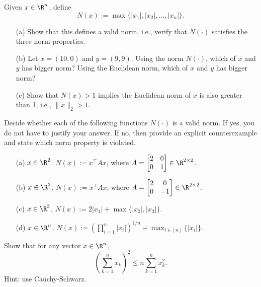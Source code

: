 \documentclass[11pt,nocut]{article}
\begin{document}


\bigskip

\begin{problem}[2.5 points]
Given $x\in\R^n$, define 
$$
N(x) := \max\{|x_1|,|x_2|,...,|x_n|\}. 
$$
\begin{itemize}
    \item[(a)] Show that this defines a valid norm, i.e., verify that $N(\cdot)$ satisfies the three norm properties. 
    \item[(b)] Let $x = (10,0)$ and $y = (9,9)$. Using the norm $N(\cdot)$, which of $x$ and $y$ has bigger norm? Using the Euclidean norm, which of $x$ and $y$ has bigger norm?
    \item[(c)] Show that $N(x) > 1$ implies the Euclidean norm of $x$ is also greater than 1, i.e., $\|x\|_2 > 1$. 
\end{itemize}
    
\end{problem}

\vspace{1mm}

\begin{problem}[2 points] 
Decide whether each of the following functions $N(\cdot)$ is a valid norm. If yes, you do not have to justify your answer. If no, then provide an explicit counterexample and state which norm property is violated. 
\begin{itemize}
    \item [(a)] $x\in\R^2$. $N(x) := x^\top A x$, where $A = \begin{bmatrix}
        2 & 0 \\ 0 & 1
    \end{bmatrix}\in\R^{2\times 2}$. 
    \item[(b)]  $x\in\R^2$. $N(x) := x^\top A x$, where $A = \begin{bmatrix}
        2 & 0 \\ 0 & -1
    \end{bmatrix}\in\R^{2\times 2}$. 
    \item[(c)] $x\in\R^3$. $N(x) := 2|x_1| + \max\{|x_2|,|x_3|\}$. 
    \item[(d)] $x\in\R^n$. $N(x) := \left(\prod_{i=1}^n |x_i|\right)^{1/n} + \max_{i\in [n]}\{|x_i|\}$. 
\end{itemize}
\end{problem}

\vspace{1mm} 

\begin{problem}[1 point]
    Show that for any vector $x \in \R^n$, $$\displaystyle \left(\sum_{k=1}^n x_k \right)^2 \leq n \sum_{k = 1}^n x_k^2.$$ 
Hint: use Cauchy-Schwarz. 
\end{problem}
\end{document}
